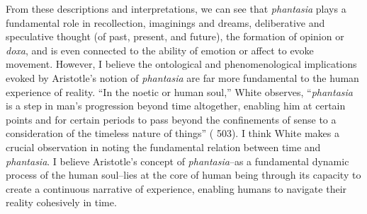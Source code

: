 \documentclass{article}
\begin{document}
From these descriptions and interpretations, we can see that \textit{phantasia} plays a fundamental role in recollection, imaginings and dreams, deliberative and speculative thought (of past, present, and future), the formation of opinion or \textit{doxa}, and is even connected to the ability of emotion or affect to evoke movement. However, I believe the ontological and phenomenological implications evoked by Aristotle's notion of \textit{phantasia} are far more fundamental to the human experience of reality. ``In the noetic or human soul,'' White observes, ``\textit{phantasia} is a step in man's progression beyond time altogether, enabling him at certain points and for certain periods to pass beyond the confinements of sense to a consideration of the timeless nature of things'' (\cite{white1985meaning} 503). I think White makes a crucial observation in noting the fundamental relation between time and \textit{phantasia}. I believe Aristotle's concept of \textit{phantasia}--as a fundamental dynamic process of the human soul--lies at the core of human being through its capacity to create a continuous narrative of experience, enabling humans to navigate their reality cohesively in time.
\end{document}
